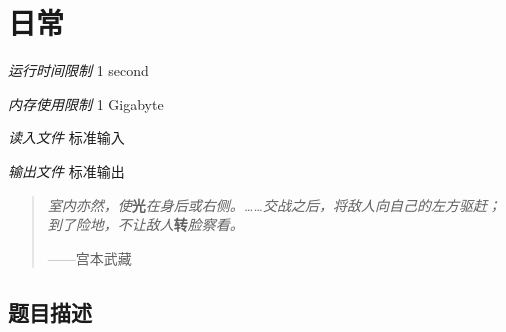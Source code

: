 \section[D. 日常]{ 日常}


\textit{运行时间限制}   1 second

\textit{内存使用限制} 1 Gigabyte

\textit{读入文件} \qquad 标准输入

\textit{输出文件} \qquad 标准输出


\begin{quote}
   \textit{室内亦然，使}\textbf{光}\textit{在身后或右侧。……交战之后，将敌人向自己的左方驱赶；到了险地，不让敌人}\textbf{转}\textit{脸察看。}
   \begin{flushright}
   ——宫本武藏
   \end{flushright}
\end{quote}


\subsection{题目描述}


